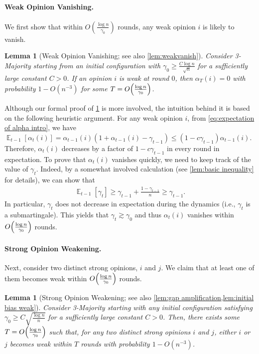 \documentclass[letterpaper,11pt]{article}
\newtheorem{lemma}[theorem]{Lemma}
\DeclareMathOperator*{\E}{\mathbb{E}}
\newcommand{\alphanorm}{\gamma}
\begin{document}
\paragraph*{Weak Opinion Vanishing.}
We first show that within $O\left(\frac{\log n}{\alphanorm_0}\right)$ rounds, any weak opinion $i$ is likely to vanish.
\begin{lemma}[Weak Opinion Vanishing; see also \cref{lem:weakvanish}] \label{lem:weak opinion vanishing intro}
  Consider 3-Majority starting from an initial configuration with $\alphanorm_0 \ge \frac{C\log n}{\sqrt{n}}$ for a sufficiently large constant $C>0$.
  If an opinion $i$ is weak at round $0$, then $\alpha_T(i) = 0$ with probability $1-O(n^{-3})$ for some $T = O\qty(\frac{\log n}{\alphanorm_0})$.
\end{lemma}
Although our formal proof of \cref{lem:weak opinion vanishing intro} is more involved, the intuition behind it is based on the following heuristic argument.
For any weak opinion $i$, from \cref{eq:expectation of alpha intro}, we have $\E_{t-1}[\alpha_t(i)] = \alpha_{t-1}(i)(1+\alpha_{t-1}(i) - \alphanorm_{t-1}) \le (1-c\alphanorm_{t-1})\alpha_{t-1}(i)$.
Therefore, $\alpha_t(i)$ decreases by a factor of $1-c\alphanorm_{t-1}$ in every round in expectation.
To prove that $\alpha_t(i)$ vanishes quickly, we need to keep track of the value of $\alphanorm_t$.
Indeed, by a somewhat involved calculation (see \cref{lem:basic inequality} for details), we can show that
\begin{align}
  \E_{t-1}[\alphanorm_t] \ge \alphanorm_{t-1} + \frac{1-\alphanorm_{t-1}}{n} \ge \alphanorm_{t-1}. \label{eq:expectation of alphanorm intro}
\end{align}
In particular, $\alphanorm_t$ does not decrease in expectation during the dynamics (i.e., $\alphanorm_t$ is a submartingale).
This yields that $\alphanorm_t \gtrsim \alphanorm_0$ and thus $\alpha_t(i)$ vanishes within $O\qty(\frac{\log n}{\alphanorm_0})$ rounds.

\paragraph{Strong Opinion Weakening.}
Next, consider two distinct strong opinions, $i$ and $j$.
We claim that at least one of them becomes weak within $O\qty(\frac{\log n}{\alphanorm_0})$ rounds.
\begin{lemma}[Strong Opinion Weakening; see also \cref{lem:gap amplification,lem:initial bias weak}] \label{lem:strong opinion weakening intro}
  Consider 3-Majority starting with any initial configuration satisfying $\alphanorm_0 \ge C\sqrt{\frac{\log n}{n}}$ for a sufficiently large constant $C>0$.
  Then, there exists some $T = O\qty(\frac{\log n}{\alphanorm_0})$ such that,
  for any two distinct strong opinions $i$ and $j$, either $i$ or $j$ becomes weak within $T$ rounds with probability $1-O(n^{-3})$.
\end{lemma}
\end{document}
